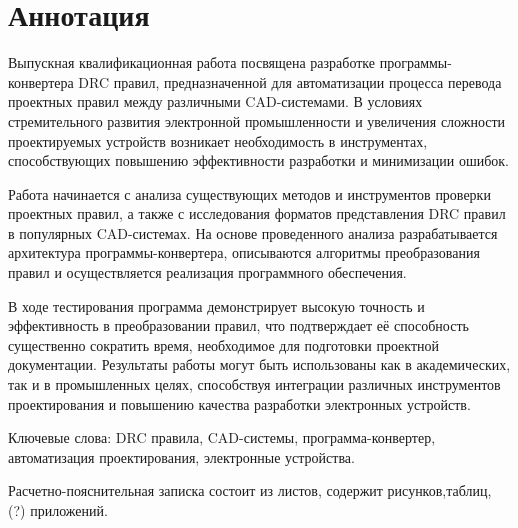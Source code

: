 
\chapter*{Аннотация}

Выпускная квалификационная работа посвящена разработке
программы-конвертера DRC правил,
предназначенной для автоматизации процесса перевода проектных правил
между различными CAD-системами.
В условиях стремительного развития электронной промышленности
и увеличения сложности проектируемых устройств возникает необходимость
в инструментах, способствующих повышению эффективности разработки
и минимизации ошибок.

Работа начинается с анализа существующих методов
и инструментов проверки проектных правил,
а также с исследования форматов представления DRC правил
в популярных CAD-системах.
На основе проведенного анализа разрабатывается архитектура
программы-конвертера, описываются алгоритмы преобразования правил
и осуществляется реализация программного обеспечения.

В ходе тестирования программа демонстрирует высокую точность
и эффективность в преобразовании правил,
что подтверждает её способность существенно сократить время,
необходимое для подготовки проектной документации.
Результаты работы могут быть использованы как в академических,
так и в промышленных целях,
способствуя интеграции различных инструментов проектирования
и повышению качества разработки электронных устройств.

Ключевые слова:
DRC правила, CAD-системы, программа-конвертер,
автоматизация проектирования, электронные устройства.

Расчетно-пояснительная записка состоит из \pageref{lastpage} листов,
содержит \totalfigures рисунков,\totaltables таблиц, (?) приложений.

